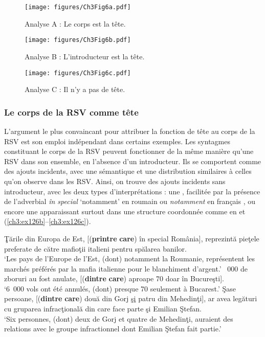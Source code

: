 
\begin{figure}
\texttt{[image: figures/Ch3Fig6a.pdf]} %
\caption{Analyse A : Le corps est la tête.}
\label{ch3:fig6a}
\end{figure}

\begin{figure}
\texttt{[image: figures/Ch3Fig6b.pdf]} %
\caption{Analyse B : L’introducteur est la tête.}
\label{ch3:fig6b}
\end{figure}

\begin{figure}
\texttt{[image: figures/Ch3Fig6c.pdf]} %
\caption{Analyse C : Il n’y a pas de tête.}
\label{ch3:fig6c}
\end{figure}


\subsubsection{Le corps de la RSV comme tête}\label{ch3:sect3.5.3.1}

L’argument le plus convaincant pour attribuer la fonction de tête au corps de la RSV est son emploi indépendant dans certains exemples. Les syntagmes constituant le corps de la RSV peuvent fonctionner de la même manière qu’une RSV dans son ensemble, en l’absence d’un introducteur. Ils se comportent comme des ajouts incidents, avec une sémantique et une distribution similaires à celles qu’on observe dans les RSV. Ainsi, on trouve des ajouts incidents sans introducteur, avec les deux types d’interprétations : une , facilitée par la présence de l’adverbial \textit{în special} ‘notamment’ en roumain  ou \textit{notamment} en français , ou encore une  apparaissant surtout dans une structure coordonnée comme en  et (\ref{ch3:ex126b}--\ref{ch3:ex126c}).

\ea \label{ch3:ex125}
\ea 
Ţările din Europa de Est, [(\textbf{printre} \textbf{care}) în special România], reprezintă pieţele preferate de către mafioţii italieni pentru spălarea banilor. \label{ch3:ex125a}\\
\glt ‘Les pays de l’Europe de l’Est, (dont) notamment la Roumanie, représentent les marchés préférés par la mafia italienne pour le blanchiment  d’argent.’
~000 de zboruri au fost anulate, [(\textbf{dintre} \textbf{care}) aproape 70 doar în Bucureşti]. \label{ch3:ex125b}\\
\glt ‘6~000 vols ont été annulés, (dont) presque 70 seulement à Bucarest.’
\ex 
Şase persoane, [(\textbf{dintre} \textbf{care}) două din Gorj \uline{şi} patru din Mehedinţi], ar avea legături cu gruparea infracţională din care face parte şi Emilian Ştefan. \label{ch3:125c}\\
\glt ‘Six personnes, (dont) deux de Gorj et quatre de Mehedinţi, auraient des relations avec le groupe infractionnel dont Emilian Ştefan fait partie.’
\z 
\z

